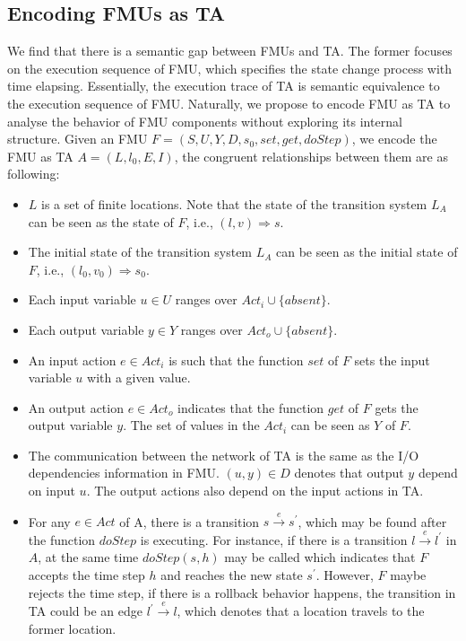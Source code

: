 \subsection{Encoding FMUs as TA}
We find that there is a semantic gap between FMUs and TA. The former focuses on the execution sequence of FMU, which specifies the state change process with time elapsing. Essentially, the execution trace of TA is semantic equivalence to the execution sequence of FMU. Naturally, we propose to encode FMU as TA to analyse the behavior of FMU components without exploring its internal structure. 
Given an FMU $F=(S,U,Y,D,s_{0},set,get,doStep)$, we encode the FMU as TA $\textit{A}=(L,l_{0},E,I)$, the congruent relationships between them are as following:
\begin{itemize}
\item
$L$ is a set of finite locations. Note that the state of the transition system $L_{\textit{A}}$ can be seen as the state of $F$, i.e., $(l,v) \Rightarrow s$.
\item
The initial state of the transition system $L_{\textit{A}}$ can be seen as the initial state of $F$, i.e., $(l_{0},v_{0}) \Rightarrow s_{0}$. 
\item
Each input variable $u \in U$ ranges over $Act_{i} \cup \{absent\}$.
\item
Each output variable $y \in Y$ ranges over $Act_{o} \cup \{absent\}$.
\item
An input action $e \in Act_{i}$ is such that the function $set$ of $F$ sets the input variable $u$ with a given value. 
\item
An output action $e \in Act_{o}$ indicates that the function $get$ of $F$ gets the output variable $y$. The set of values in the $Act_{i}$ can be seen as $Y$ of $F$.  
\item
The communication between the network of TA is the same as the I/O dependencies information in FMU. $(u,y) \in D$ denotes that output $y$ depend on input $u$. The output actions also depend on the input actions in TA.
\item
For any $e \in Act$ of A, there is a transition $s \xrightarrow{e} s^{\prime}$, which may be found after the function $doStep$ is executing. For instance, if there is a transition $l \xrightarrow{e} l^{\prime}$ in $A$, at the same time $doStep(s,h)$ may be called which indicates that $F$ accepts the time step $h$ and reaches the new state $s^{\prime}$. However, $F$ maybe rejects the time step, if there is a rollback behavior happens, the transition in TA could be an edge $l^{\prime} \xrightarrow{e} l$, which denotes that a location travels to the former location.

\end{itemize}
